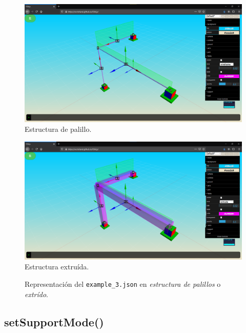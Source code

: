 \begin{figure}[ht]
  \centering
  \setlength{\columnseprule}{0pt}
  
  \begin{multicols}{2}
    \begin{minipage}[b]{0.8\columnwidth}
      \centering
      \includegraphics[width=\textwidth]{FEM.js/FEM.js-setFrameView-wireframe.png}
      Estructura de palillo.
    \end{minipage}
  
    \begin{minipage}[b]{0.8\columnwidth}
      \centering
      \includegraphics[width=\textwidth]{FEM.js/FEM.js-setFrameView-extrude.png}
      Estructura extruída.
    \end{minipage}
  \end{multicols}
  \caption{Representación del \texttt{example\_3.json} en \textit{estructura de palillos} o \textit{extrído}.}
  \label{fig:FEM.js-setFrameView}
\end{figure}

\subsection{setSupportMode()}

